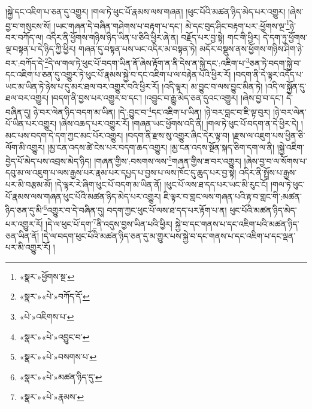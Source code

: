།སྐྱེ་དང་འཇིག་པ་ཅན་དུ་འགྱུར། །གལ་ཏེ་ཕུང་པོ་རྣམས་ལས་གཞན། །ཕུང་པོའི་མཚན་ཉིད་མེད་པར་འགྱུར། །ཞེས་བྱ་བ་གསུངས་སོ། །ཡང་གཞན་དེ་བཞིན་གཤེགས་པ་བརྟག་པ་དང་། མེ་དང་བུད་ཤིང་བརྟག་པར་:ཕྱོགས་ལྔ་\footnote{«སྣར་»ཕྱོགས་སྔ་}ཉེ་བར་བཀོད་ལ། འདིར་ནི་ཕྱོགས་གཉིས་ཉིད་ཡིན་པ་ཅིའི་ཕྱིར་ཞེ་ན། བརྗོད་པར་བྱ་སྟེ། གང་གི་ཕྱིར། དེ་དག་ཏུ་ཕྱོགས་ལྔ་བསྟན་པ་དེ་ཉིད་ཀྱི་ཕྱིར། གཞན་དུ་བསྟན་པས་ཡང་འདིར་མ་བསྟན་ཏེ། མདོར་བསྡུས་ནས་ཕྱོགས་གཉིས་ཤིག་ཉེ་བར་:བཀོད་དེ་\footnote{«སྣར་»«པེ་»བཀོད་དོ་}དེ་ལ་གལ་ཏེ་ཕུང་པོ་བདག་ཡིན་ནོ་ཞེས་རྟོག་ན་ནི་དེས་ན་སྐྱེ་དང་:འཇིག་པ་\footnote{«པེ་»འཇིགས་པ་}ཅན་ཏེ་བདག་སྐྱེ་བ་དང་འཇིག་པ་ཅན་དུ་འགྱུར་ཏེ་ཕུང་པོ་རྣམས་སྐྱེ་བ་དང་འཇིག་པ་ལ་བརྟེན་པའི་ཕྱིར་རོ། །བདག་ནི་དེ་ལྟར་འདོད་པ་ཡང་མ་ཡིན་ཏེ་ཉེས་པ་དུ་མར་ཐལ་བར་འགྱུར་བའི་ཕྱིར་རོ། །འདི་ལྟར། མ་བྱུང་བ་ལས་བྱུང་མིན་ཏེ། །འདི་ལ་སྐྱོན་དུ་ཐལ་བར་འགྱུར། །བདག་ནི་བྱས་པར་འགྱུར་བ་དང་། །འབྱུང་བ་རྒྱུ་མེད་ཅན་དུའང་འགྱུར། །ཞེས་བྱ་བ་དང་། དེ་བཞིན་དུ། ཉེ་བར་ལེན་ཉིད་བདག་མ་ཡིན། །དེ་:བྱུང་བ་\footnote{«སྣར་»«པེ་»འབྱུང་བ་}དང་འཇིག་པ་ཡིན། །ཉེ་བར་བླང་བ་ཇི་ལྟ་བུར། །ཉེ་བར་ལེན་པོ་ཡིན་པར་འགྱུར། །ཞེས་འཆད་པར་འགྱུར་རོ། །གཞན་ཡང་ཕྱོགས་འདི་ནི། །གལ་ཏེ་ཕུང་པོ་བདག་ན་དེ་ཕྱིར་དེ། །མང་པས་བདག་དེ་དག་ཀྱང་མང་པོར་འགྱུར། །བདག་ནི་རྫས་སུ་འགྱུར་ཞིང་དེར་ལྟ་བ། །རྫས་ལ་འཇུག་པས་ཕྱིན་ཅི་ལོག་མི་འགྱུར། །མྱ་ངན་འདས་ཚེ་ངེས་པར་བདག་ཆད་འགྱུར། །མྱ་ངན་འདས་སྔོན་སྐད་ཅིག་དག་ལ་ནི། །སྐྱེ་འཇིག་བྱེད་པོ་མེད་པས་འབྲས་མེད་ཉིད། །གཞན་གྱིས་:བསགས་ལས་\footnote{«སྣར་»«པེ་»བསགས་པ་}གཞན་གྱིས་ཟ་བར་འགྱུར། །ཞེས་བྱ་བ་ལ་སོགས་པ་དབུ་མ་ལ་འཇུག་པ་ལས་རྒྱས་པར་རྣམ་པར་དཔྱད་པ་བྱས་པ་ལས་ཁོང་དུ་ཆུད་པར་བྱ་སྟེ། འདིར་ནི་སྤྲོས་པ་རྒྱས་པར་མི་བརྩམ་མོ། །དེ་ལྟར་རེ་ཞིག་ཕུང་པོ་བདག་མ་ཡིན་ནོ། །ཕུང་པོ་ལས་ཐ་དད་པར་ཡང་མི་རུང་ངོ། །གལ་ཏེ་ཕུང་པོ་རྣམས་ལས་གཞན་ཕུང་པོའི་མཚན་ཉིད་མེད་པར་འགྱུར། ཇི་ལྟར་བ་གླང་ལས་གཞན་པའི་རྟ་བ་གླང་གི་:མཚན་ཉིད་ཅན་དུ་མི་\footnote{«སྣར་»«པེ་»མཚན་ཉིད་དུ་}འགྱུར་བ་དེ་བཞིན་དུ། བདག་ཀྱང་ཕུང་པོ་ལས་ཐ་དད་པར་རྟོག་པ་ན། ཕུང་པོའི་མཚན་ཉིད་མེད་པར་འགྱུར་རོ། །དེ་ལ་ཕུང་པོ་དག་\footnote{«སྣར་»«པེ་»རྣམས་}ནི་འདུས་བྱས་ཡིན་པའི་ཕྱིར། སྐྱེ་བ་དང་གནས་པ་དང་འཇིག་པའི་མཚན་ཉིད་ཅན་ཡིན་ནོ། །དེ་ལ་བདག་ཕུང་པོའི་མཚན་ཉིད་ཅན་དུ་མ་གྱུར་པས་སྐྱེ་བ་དང་གནས་པ་དང་འཇིག་པ་དང་ལྡན་པར་མི་འགྱུར་རོ། །

